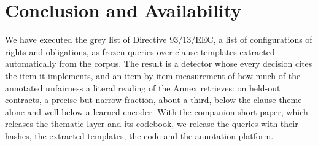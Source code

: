 \section{Conclusion and Availability}
\label{sec:conclusion}
We have executed the grey list of Directive 93/13/EEC, a list of configurations of rights and obligations, as frozen queries over clause templates extracted automatically from the \corpus{} corpus. The result is a detector whose every decision cites the item it implements, and an item-by-item measurement of how much of the annotated unfairness a literal reading of the Annex retrieves: on held-out contracts, a precise but narrow fraction, about a third, below the clause theme alone and well below a learned encoder. With the companion short paper, which releases the thematic layer and its codebook, we release the queries with their hashes, the extracted templates, the code and the annotation platform.
